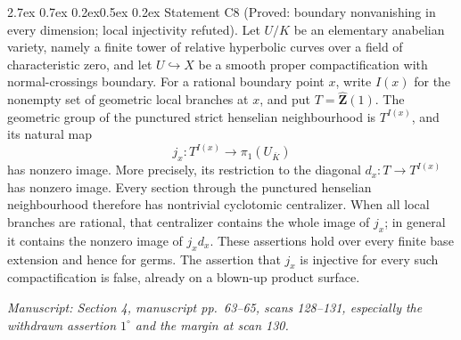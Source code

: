 \documentclass[11pt,a4paper]{article}
\makeatletter
\newcommand{\passage}[1]{\par\smallskip\noindent\textit{Manuscript: #1}\par\smallskip}
\renewcommand\paragraph{\@startsection{paragraph}{4}{\z@}%
  {2.7ex \@plus 0.7ex \@minus 0.2ex}{0.5ex \@plus 0.2ex}%
  {\normalfont\normalsize\bfseries}}
\makeatother
\begin{document}
\paragraph{Statement C8 (Proved: boundary nonvanishing in every dimension;
local injectivity refuted).}\label{res:C8}
Let $U/K$ be an elementary anabelian variety, namely a finite tower of
relative hyperbolic curves over a field of characteristic zero, and let
$U\hookrightarrow X$ be a smooth proper compactification with
normal-crossings boundary. For a rational boundary point $x$, write
$I(x)$ for the nonempty set of geometric local branches at $x$, and put
$T=\widehat{\mathbf Z}(1)$. The geometric group of the punctured strict
henselian neighbourhood is $T^{I(x)}$, and its natural map
\[
 j_x:T^{I(x)}\longrightarrow\pi_1(U_{\overline K})
\]
has nonzero image. More precisely, its restriction to the diagonal
$d_x:T\to T^{I(x)}$ has nonzero image. Every section through the
punctured henselian neighbourhood therefore has nontrivial cyclotomic
centralizer. When all local branches are rational, that centralizer
contains the whole image of $j_x$; in general it contains the nonzero
image of $j_xd_x$. These assertions hold over every finite base extension
and hence for germs. The assertion that $j_x$ is injective for every
such compactification is false, already on a blown-up product surface.
\passage{Section 4, manuscript pp.~63--65, scans 128--131, especially
the withdrawn assertion $1^\circ$ and the margin at scan 130.}
\end{document}
